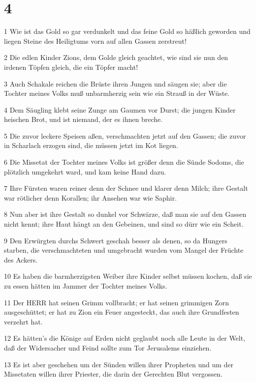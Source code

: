 \chapter{4}

\par 1 Wie ist das Gold so gar verdunkelt und das feine Gold so häßlich geworden und liegen Steine des Heiligtums vorn auf allen Gassen zerstreut!
\par 2 Die edlen Kinder Zions, dem Golde gleich geachtet, wie sind sie nun den irdenen Töpfen gleich, die ein Töpfer macht!
\par 3 Auch Schakale reichen die Brüste ihren Jungen und säugen sie; aber die Tochter meines Volks muß unbarmherzig sein wie ein Strauß in der Wüste.
\par 4 Dem Säugling klebt seine Zunge am Gaumen vor Durst; die jungen Kinder heischen Brot, und ist niemand, der es ihnen breche.
\par 5 Die zuvor leckere Speisen aßen, verschmachten jetzt auf den Gassen; die zuvor in Scharlach erzogen sind, die müssen jetzt im Kot liegen.
\par 6 Die Missetat der Tochter meines Volks ist größer denn die Sünde Sodoms, die plötzlich umgekehrt ward, und kam keine Hand dazu.
\par 7 Ihre Fürsten waren reiner denn der Schnee und klarer denn Milch; ihre Gestalt war rötlicher denn Korallen; ihr Ansehen war wie Saphir.
\par 8 Nun aber ist ihre Gestalt so dunkel vor Schwärze, daß man sie auf den Gassen nicht kennt; ihre Haut hängt an den Gebeinen, und sind so dürr wie ein Scheit.
\par 9 Den Erwürgten durchs Schwert geschah besser als denen, so da Hungers starben, die verschmachteten und umgebracht wurden vom Mangel der Früchte des Ackers.
\par 10 Es haben die barmherzigsten Weiber ihre Kinder selbst müssen kochen, daß sie zu essen hätten im Jammer der Tochter meines Volks.
\par 11 Der HERR hat seinen Grimm vollbracht; er hat seinen grimmigen Zorn ausgeschüttet; er hat zu Zion ein Feuer angesteckt, das auch ihre Grundfesten verzehrt hat.
\par 12 Es hätten's die Könige auf Erden nicht geglaubt noch alle Leute in der Welt, daß der Widersacher und Feind sollte zum Tor Jerusalems einziehen.
\par 13 Es ist aber geschehen um der Sünden willen ihrer Propheten und um der Missetaten willen ihrer Priester, die darin der Gerechten Blut vergossen.
